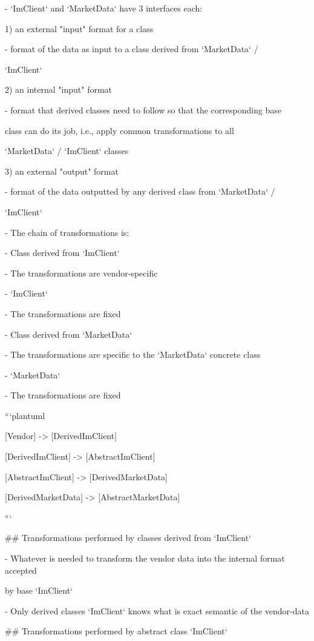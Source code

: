 \documentclass[11pt, reqno]{amsart}
\begin{document}
- `ImClient` and `MarketData` have 3 interfaces each:

1) an external "input" format for a class

- format of the data as input to a class derived from `MarketData` /

`ImClient`

2) an internal "input" format

- format that derived classes need to follow so that the corresponding
base

class can do its job, i.e., apply common transformations to all

`MarketData` / `ImClient` classes

3) an external "output" format

- format of the data outputted by any derived class from `MarketData` /

`ImClient`

- The chain of transformations is:

- Class derived from `ImClient`

- The transformations are vendor-specific

- `ImClient`

- The transformations are fixed

- Class derived from `MarketData`

- The transformations are specific to the `MarketData` concrete class

- `MarketData`

- The transformations are fixed

```plantuml

{[}Vendor{]} -\textgreater{} {[}DerivedImClient{]}

{[}DerivedImClient{]} -\textgreater{} {[}AbstractImClient{]}

{[}AbstractImClient{]} -\textgreater{} {[}DerivedMarketData{]}

{[}DerivedMarketData{]} -\textgreater{} {[}AbstractMarketData{]}

```

\#\# Transformations performed by classes derived from `ImClient`

- Whatever is needed to transform the vendor data into the internal
format accepted

by base `ImClient`

- Only derived classes `ImClient` knows what is exact semantic of the
vendor-data

\#\# Transformations performed by abstract class `ImClient`
\end{document}
